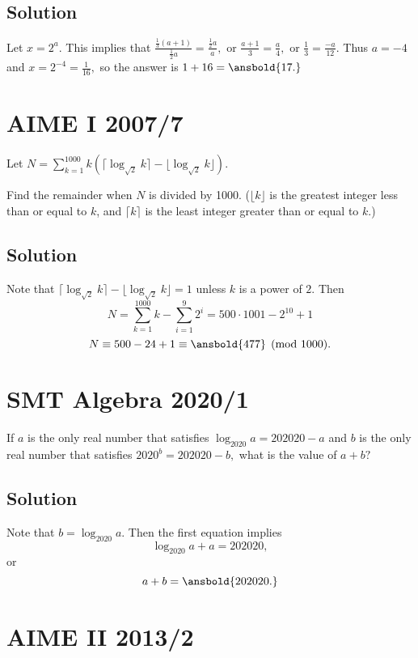 \documentclass{article}
\begin{document}
\subsection{Solution}

Let $x=2^a.$ This implies that $\frac{\frac{1}{3}(a+1)}{\frac{1}{2}a}=\frac{\frac{1}{2}a}{a},$ or $\frac{a+1}{3}=\frac{a}{4},$ or $\frac{1}{3}=\frac{-a}{12}.$ Thus $a=-4$ and $x=2^{-4}=\frac{1}{16},$ so the answer is $1+16=\ansbold{17.}$

\pagebreak\section{AIME I 2007/7}

Let $N = \sum\limits_{k = 1}^{1000} k ( \lceil \log_{\sqrt{2}} k \rceil  - \lfloor \log_{\sqrt{2}} k \rfloor ).$

Find the remainder when $N$ is divided by 1000. ($\lfloor{k}\rfloor$ is the greatest integer less than or equal to $k$, and $\lceil{k}\rceil$ is the least integer greater than or equal to $k$.)

\subsection{Solution}

Note that $\lceil\log_{\sqrt{2}}k\rceil-\lfloor\log_{\sqrt{2}}k\rfloor=1$ unless $k$ is a power of $2.$ Then
    \[N=\sum\limits_{k=1}^{1000}k-\sum\limits_{i=1}^{9}2^i=500\cdot 1001-2^{10}+1\]
    \[N\equiv 500-24+1\equiv \ansbold{477}\pmod{1000}.\]

\pagebreak\section{SMT Algebra 2020/1}

If $a$ is the only real number that satisfies $\log_{2020}a=202020-a$ and $b$ is the only real number that satisfies $2020^b=202020-b,$ what is the value of $a+b?$

\subsection{Solution}

Note that $b=\log_{2020}a.$ Then the first equation implies
    \[\log_{2020}a+a=202020,\] or
    \[a+b=\ansbold{202020.}\]

\pagebreak\section{AIME II 2013/2}
\end{document}
